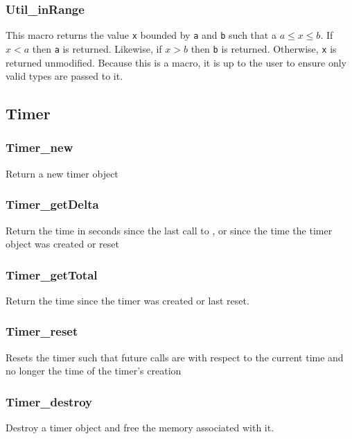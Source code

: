 \subsubsection{Util\_inRange} \label{apiutilrange}
 This macro returns the value \texttt{x}
bounded by \texttt{a} and \texttt{b} such that a $a \leq x \leq b$. If $x < a$
then \texttt{a} is returned. Likewise, if $x > b$ then \texttt{b} is
returned. Otherwise, \texttt{x} is returned unmodified. Because this is a macro,
it is up to the user to ensure only valid types are passed to it.

\subsection{Timer} \label{apitimer}
\subsubsection{Timer\_new} \label{apitimernew}
 Return a new timer object

\subsubsection{Timer\_getDelta} \label{apitimerdelta}
 Return the time in seconds since the 
last call to , or since the time the timer object was
created or reset

\subsubsection{Timer\_getTotal} \label{apitimertotal}
 Return the time since the timer was 
created or last reset.

\subsubsection{Timer\_reset} \label{apitimerreset}
 Resets the timer such that future 
 calls are with respect to the current time and no longer the 
time of the timer's creation

\subsubsection{Timer\_destroy} \label{apitimerdestroy}
 Destroy a timer object and free the memory
associated with it.

